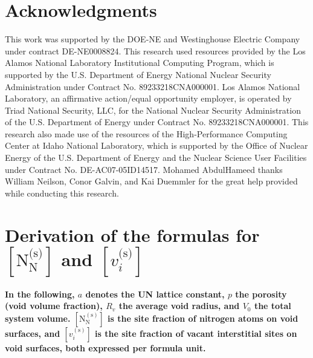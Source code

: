 \documentclass[preprint,12pt,sort&compress]{elsarticle}
\newcommand{\?}{\stackrel{?}{=}}
\providecommand{\DIFaddtex}[1]{{\bf #1}} %
\providecommand{\DIFaddbegin}{\protect\color{blue}} %
\providecommand{\DIFadd}[1]{\texorpdfstring{\DIFaddtex{#1}}{#1}} %
\newcommand{\DIFaddincludegraphics}[2][]{{\color{blue}\fbox{\DIFOincludegraphics[#1]{#2}}}} %
\DeclareRobustCommand{\DIFaddbegin}{\DIFOaddbegin \let\includegraphics\DIFaddincludegraphics} %
\begin{document}
\section{Acknowledgments}

This work was supported by the DOE-NE and Westinghouse Electric Company under contract DE-NE0008824. This research used resources provided by the Los Alamos National Laboratory Institutional Computing Program, which is supported by the U.S. Department of Energy National Nuclear Security Administration under Contract No. 89233218CNA000001. Los Alamos National Laboratory, an affirmative action/equal opportunity employer, is operated by Triad National Security, LLC, for the National Nuclear Security Administration of the U.S. Department of Energy under Contract No. 89233218CNA000001. This research also made use of the resources of the High-Performance Computing Center at Idaho National Laboratory, which is supported by the Office of Nuclear Energy of the U.S. Department of Energy and the Nuclear Science User Facilities under Contract No. DE-AC07-05ID14517. Mohamed AbdulHameed thanks William Neilson, Conor Galvin, and Kai Duemmler for the great help provided while conducting this research.

\appendix

\section{Derivation of the formulas for $[ \text{N}_\text{N}^\text{(s)} ]$ and $[ v_i^\text{(s)} ]$}
\label{App1}

\DIFaddbegin \DIFadd{In the following, $a$ denotes the UN lattice constant, $p$ the porosity (void volume fraction), $R_v$ the average void radius, and $V_0$ the total system volume. $[\text{N}_\text{N}^{(\text{s})}]$ is the site fraction of nitrogen atoms on void surfaces, and $[v_i^{(\text{s})}]$ is the site fraction of vacant interstitial sites on void surfaces, both expressed per formula unit.
}
\end{document}
